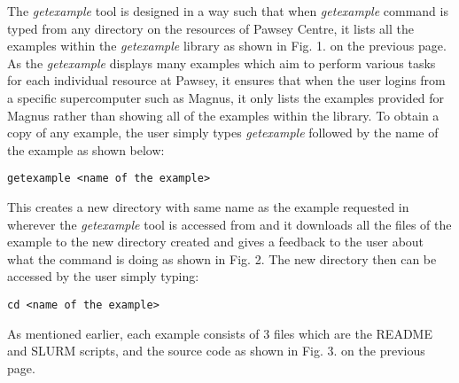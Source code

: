 The \emph{getexample} tool is designed in a way such that when \emph{getexample} command is typed from any directory on the resources of Pawsey Centre, it 
lists all the examples within the \emph{getexample} library as shown in Fig. 1. on the previous page. As the \emph{getexample} displays many examples which aim to 
perform various tasks for each individual resource at Pawsey, it ensures that when the user logins from a specific supercomputer such as Magnus, it 
only lists the examples provided for Magnus rather than showing all of the examples within the library. To obtain a copy of any example, the user simply 
types \emph{getexample} followed by the name of the example as shown below:

\begin{tcolorbox}
\begin{Verbatim}[fontsize=\scriptsize]
getexample <name of the example>
\end{Verbatim}
\end{tcolorbox}

This creates a new directory with same name as the example requested in wherever the \emph{getexample} tool is accessed from and it downloads all the files of
the example to the new directory created and gives a feedback to the user about what the command is doing as shown in Fig. 2. The new directory then can 
be accessed by the user simply typing:

\begin{tcolorbox}
\begin{Verbatim}[fontsize=\scriptsize]
cd <name of the example>
\end{Verbatim}
\end{tcolorbox}



As mentioned earlier, each example consists of 3 files which are the README and SLURM scripts, and the source code as shown in Fig. 3. on the previous
page.


